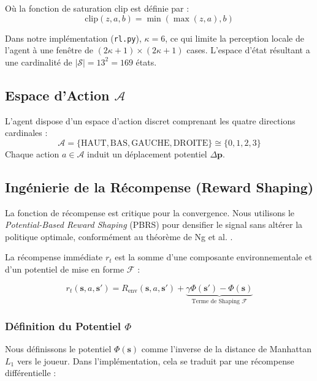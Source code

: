 \documentclass[12pt,a4paper]{article}
\newcommand{\state}{\mathbf{s}}
\newcommand{\action}{a}
\begin{document}
Où la fonction de saturation $\text{clip}$ est définie par :
\begin{equation}
    \text{clip}(z, a, b) = \min(\max(z, a), b)
\end{equation}

Dans notre implémentation (\texttt{rl.py}), $\kappa=6$, ce qui limite la perception locale de l'agent à une fenêtre de $(2\kappa+1) \times (2\kappa+1)$ cases. L'espace d'état résultant a une cardinalité de $|\mathcal{S}| = 13^2 = 169$ états.

\subsection{Espace d'Action \texorpdfstring{$\mathcal{A}$}{A}}
L'agent dispose d'un espace d'action discret comprenant les quatre directions cardinales :
\begin{equation}
    \mathcal{A} = \{ \text{HAUT}, \text{BAS}, \text{GAUCHE}, \text{DROITE} \} \cong \{0, 1, 2, 3\}
\end{equation}
Chaque action $\action \in \mathcal{A}$ induit un déplacement potentiel $\Delta \mathbf{p}$.

\subsection{Ingénierie de la Récompense (Reward Shaping)}
La fonction de récompense est critique pour la convergence. Nous utilisons le \textit{Potential-Based Reward Shaping} (PBRS) pour densifier le signal sans altérer la politique optimale, conformément au théorème de Ng et al. \cite{ng1999policy}.

La récompense immédiate $r_t$ est la somme d'une composante environnementale et d'un potentiel de mise en forme $\mathcal{F}$ :

\begin{equation}
    r_t(\state, \action, \state') = R_{\text{env}}(\state, \action, \state') + \underbrace{\gamma \Phi(\state') - \Phi(\state)}_{\text{Terme de Shaping } \mathcal{F}}
\end{equation}

\subsubsection{Définition du Potentiel $\Phi$}
Nous définissons le potentiel $\Phi(\state)$ comme l'inverse de la distance de Manhattan $L_1$ vers le joueur. Dans l'implémentation, cela se traduit par une récompense différentielle :
\end{document}
